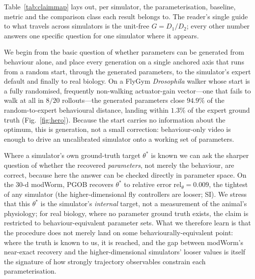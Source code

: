 \documentclass[11pt]{article}
\begin{document}
Table~\ref{tab:claimmap} lays out, per simulator, the parameterisation, baseline, metric and the comparison class each result belongs to. The reader's single guide to what travels across simulators is the unit-free $G{=}D_1/D_2$; every other number answers one specific question for one simulator where it appears.

We begin from the basic question of whether parameters can be generated from behaviour alone, and place every generation on a single anchored axis that runs from a random start, through the generated parameters, to the simulator's expert default and finally to real biology. On a FlyGym \emph{Drosophila} walker whose start is a fully randomised, frequently non-walking actuator-gain vector---one that fails to walk at all in $8/20$ rollouts---the generated parameters close $94.9\%$ of the random-to-expert behavioural distance, landing within $1.3\%$ of the expert ground truth (Fig.~\ref{fig:hero}). Because the start carries no information about the optimum, this is generation, not a small correction: behaviour-only video is enough to drive an uncalibrated simulator onto a working set of parameters.

Where a simulator's own ground-truth target $\theta^{*}$ is known we can ask the sharper question of whether the recovered \emph{parameters}, not merely the behaviour, are correct, because here the answer can be checked directly in parameter space. On the $30$-d modWorm, PGOB recovers $\theta^{*}$ to relative error $\mathrm{rel}_\theta{=}0.009$, the tightest of any simulator (the higher-dimensional fly controllers are looser; SI). We stress that this $\theta^{*}$ is the simulator's \emph{internal} target, not a measurement of the animal's physiology; for real biology, where no parameter ground truth exists, the claim is restricted to behaviour-equivalent parameter sets. What we therefore learn is that the procedure does not merely land on some behaviourally-equivalent point: where the truth is known to us, it is reached, and the gap between modWorm's near-exact recovery and the higher-dimensional simulators' looser values is itself the signature of how strongly trajectory observables constrain each parameterisation.
\end{document}
